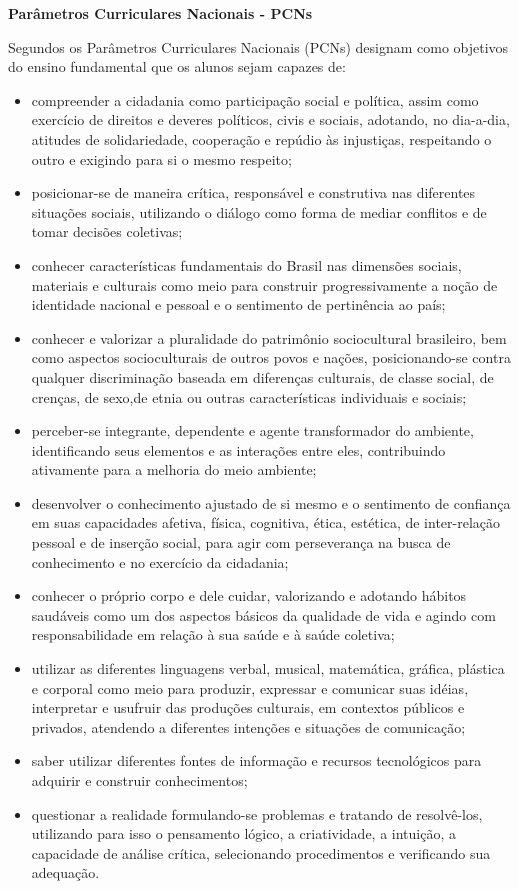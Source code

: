 \hspace{1.5cm}
\textbf{Parâmetros Curriculares Nacionais - PCNs}

Segundos os Parâmetros Curriculares Nacionais (PCNs) designam como objetivos do ensino fundamental que os alunos sejam capazes de: 

\begin{itemize}
\item compreender a cidadania como participação social e política, assim como exercício de direitos e deveres políticos, civis e sociais, adotando, no dia-a-dia, atitudes de solidariedade, cooperação e repúdio às injustiças, respeitando o outro e exigindo para si o mesmo respeito; 

\item posicionar-se de maneira crítica, responsável e construtiva nas diferentes situações sociais, utilizando o diálogo como forma de mediar conflitos e de tomar decisões coletivas; 

\item conhecer características fundamentais do Brasil nas dimensões sociais, materiais e culturais como meio para construir progressivamente a noção de identidade nacional e pessoal e o sentimento de pertinência ao país; 

\item conhecer e valorizar a pluralidade do patrimônio sociocultural brasileiro, bem como aspectos socioculturais de outros povos e nações, posicionando-se contra qualquer discriminação baseada em diferenças culturais, de classe social, de crenças, de sexo,de etnia ou outras características individuais e sociais;  
\item perceber-se integrante, dependente e agente transformador do ambiente, identificando seus elementos e as interações entre eles, contribuindo ativamente para a melhoria do meio ambiente;
\item desenvolver o conhecimento ajustado de si mesmo e o sentimento de confiança em suas capacidades afetiva, física, cognitiva, ética, estética, de inter-relação pessoal e de inserção social, para agir com perseverança na busca de conhecimento e no exercício da cidadania;
\item conhecer o próprio corpo e dele cuidar, valorizando e adotando hábitos saudáveis como um dos aspectos básicos da qualidade de vida e agindo com responsabilidade em relação à sua saúde e à saúde coletiva;
\item utilizar as diferentes linguagens  verbal, musical, matemática, gráfica, plástica e corporal  como meio para produzir, expressar e comunicar suas idéias, interpretar e usufruir das produções culturais, em contextos públicos e privados, atendendo a diferentes intenções e situações de comunicação;
\item saber utilizar diferentes fontes de informação e recursos tecnológicos para adquirir e construir conhecimentos;
\item questionar a realidade formulando-se problemas e tratando de resolvê-los, utilizando para isso o pensamento lógico, a criatividade, a intuição, a capacidade de análise crítica, selecionando procedimentos e verificando sua adequação.
\end{itemize}


